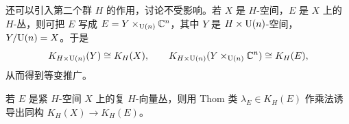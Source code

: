 还可以引入第二个群 $H$ 的作用，讨论不受影响。若 $X$ 是 $H$-空间，$E$ 是 $X$ 上的 $H$-丛，则可把 $E$ 写成 $E=Y\times_{\mathrm{U}(n)}\mathbb{C}^n$，其中 $Y$ 是 $H\times\mathrm{U}(n)$-空间，$Y/\mathrm{U}(n)=X$。于是
\[
K_{H\times\mathrm{U}(n)}(Y)\cong K_H(X),\qquad K_{H\times\mathrm{U}(n)}(Y\times_{\mathrm{U}(n)}\mathbb{C}^n)\cong K_H(E),
\]
从而得到等变推广。

\begin{corollary}
若 $E$ 是紧 $H$-空间 $X$ 上的复 $H$-向量丛，则用 Thom 类 $\lambda_E\in K_H(E)$ 作乘法诱导出同构 $K_H(X)\to K_H(E)$。
\end{corollary}
